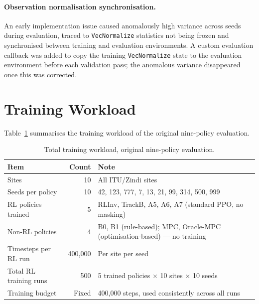\paragraph{Observation normalisation synchronisation.} An early
implementation issue caused anomalously high variance across seeds
during evaluation, traced to \texttt{VecNormalize} statistics not being
frozen and synchronised between training and evaluation environments. A
custom evaluation callback was added to copy the training
\texttt{VecNormalize} state to the evaluation environment before each
validation pass; the anomalous variance disappeared once this was
corrected.


\section{Training Workload}
\label{sec:training_execution}

Table~\ref{tab:training_workload} summarises the training workload of the original nine-policy evaluation.

\begin{table}[htb]
\centering
\small
\setlength{\tabcolsep}{5pt}
\caption{Total training workload, original nine-policy evaluation.}
\label{tab:training_workload}
\begin{tabular}{lrp{5.8cm}}
\toprule
\textbf{Item} & \textbf{Count} & \textbf{Note} \\
\midrule
Sites                    & 10  & All ITU/Zindi sites \\
Seeds per policy         & 10  & 42, 123, 777, 7, 13, 21, 99, 314, 500, 999 \\
RL policies trained      & 5   & RLInv, TrackB, A5, A6, A7 (standard PPO,
                                 no masking) \\
Non-RL policies          & 4   & B0, B1 (rule-based); MPC, Oracle-MPC
                                 (optimisation-based) --- no training \\
Timesteps per RL run     & 400{,}000 & Per site per seed \\
Total RL training runs   & 500 & 5 trained policies $\times$ 10 sites
                                 $\times$ 10 seeds \\
Training budget          & Fixed & 400{,}000 steps, used consistently across all runs \\
\bottomrule
\end{tabular}
\end{table}

